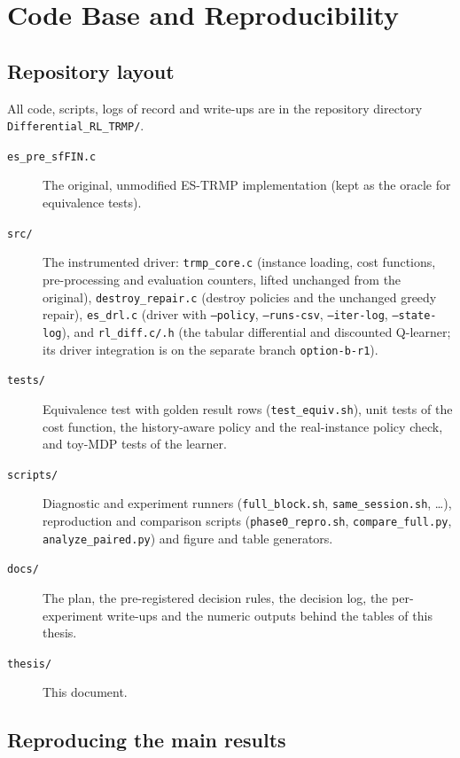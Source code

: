 
\chapter{Code Base and Reproducibility}\label{AppendixC}

\section{Repository layout}

All code, scripts, logs of record and write-ups are in the repository directory \texttt{Differential\_RL\_TRMP/}.

\begin{description}
\item[\texttt{es\_pre\_sfFIN.c}] The original, unmodified ES-TRMP implementation (kept as the oracle for equivalence tests).
\item[\texttt{src/}] The instrumented driver: \texttt{trmp\_core.c} (instance loading, cost functions, pre-processing and evaluation counters, lifted unchanged from the original), \texttt{destroy\_repair.c} (destroy policies and the unchanged greedy repair), \texttt{es\_drl.c} (driver with \texttt{--policy}, \texttt{--runs-csv}, \texttt{--iter-log}, \texttt{--state-log}), and \texttt{rl\_diff.c/.h} (the tabular differential and discounted Q-learner; its driver integration is on the separate branch \texttt{option-b-r1}).
\item[\texttt{tests/}] Equivalence test with golden result rows (\texttt{test\_equiv.sh}), unit tests of the cost function, the history-aware policy and the real-instance policy check, and toy-MDP tests of the learner.
\item[\texttt{scripts/}] Diagnostic and experiment runners (\texttt{full\_block.sh}, \texttt{same\_session.sh}, \ldots), reproduction and comparison scripts (\texttt{phase0\_repro.sh}, \texttt{compare\_full.py}, \texttt{analyze\_paired.py}) and figure and table generators.
\item[\texttt{docs/}] The plan, the pre-registered decision rules, the decision log, the per-experiment write-ups and the numeric outputs behind the tables of this thesis.
\item[\texttt{thesis/}] This document.
\end{description}

\section{Reproducing the main results}

